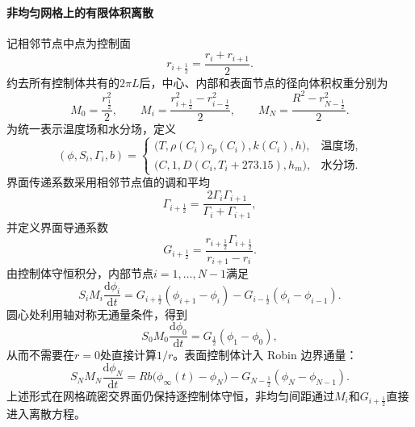 \documentclass[withoutpreface,bwprint]{cumcmthesis}
\begin{document}
\paragraph{非均匀网格上的有限体积离散}
记相邻节点中点为控制面
\begin{equation}
r_{i+\frac12}=\frac{r_i+r_{i+1}}{2}.
\label{eq:q2-control-faces}
\end{equation}
约去所有控制体共有的$2\pi L$后，中心、内部和表面节点的径向体积权重分别为
\begin{equation}
M_0=\frac{r_{\frac12}^2}{2},
\qquad
M_i=\frac{r_{i+\frac12}^2-r_{i-\frac12}^2}{2},
\qquad
M_N=\frac{R^2-r_{N-\frac12}^2}{2}.
\label{eq:q2-control-weights}
\end{equation}
为统一表示温度场和水分场，定义
\begin{equation}
(\phi,S_i,\Gamma_i,b)=
\begin{cases}
\bigl(T,\rho(C_i)c_p(C_i),k(C_i),h\bigr),
&\text{温度场},\\
\bigl(C,1,D(C_i,T_i+273.15),h_m\bigr),
&\text{水分场}.
\end{cases}
\label{eq:q2-unified-parameters}
\end{equation}
界面传递系数采用相邻节点值的调和平均
\begin{equation}
\Gamma_{i+\frac12}
=
\frac{2\Gamma_i\Gamma_{i+1}}{\Gamma_i+\Gamma_{i+1}},
\label{eq:q2-harmonic-coefficient}
\end{equation}
并定义界面导通系数
\begin{equation}
G_{i+\frac12}
=
\frac{r_{i+\frac12}\Gamma_{i+\frac12}}
{r_{i+1}-r_i}.
\label{eq:q2-face-conductance}
\end{equation}
由控制体守恒积分，内部节点$i=1,\ldots,N-1$满足
\begin{equation}
S_iM_i\frac{\mathrm d\phi_i}{\mathrm dt}
=
G_{i+\frac12}(\phi_{i+1}-\phi_i)
-G_{i-\frac12}(\phi_i-\phi_{i-1}).
\label{eq:q2-fvm-interior}
\end{equation}
圆心处利用轴对称无通量条件，得到
\begin{equation}
S_0M_0\frac{\mathrm d\phi_0}{\mathrm dt}
=
G_{\frac12}(\phi_1-\phi_0),
\label{eq:q2-fvm-center}
\end{equation}
从而不需要在$r=0$处直接计算$1/r$。表面控制体计入 Robin 边界通量：
\begin{equation}
S_NM_N\frac{\mathrm d\phi_N}{\mathrm dt}
=
Rb\bigl(\phi_\infty(t)-\phi_N\bigr)
-G_{N-\frac12}(\phi_N-\phi_{N-1}).
\label{eq:q2-fvm-surface}
\end{equation}
上述形式在网格疏密交界面仍保持逐控制体守恒，非均匀间距通过$M_i$和$G_{i+\frac12}$直接进入离散方程。
\end{document}
